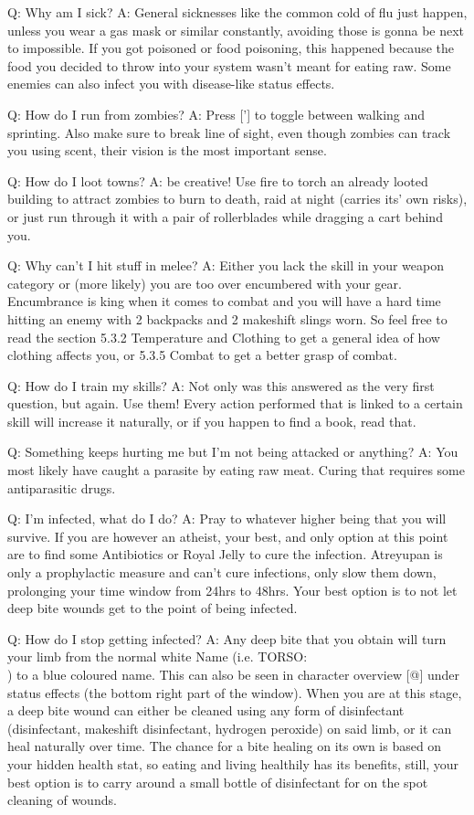 \documentclass[11pt]{report}
\begin{document}
Q: Why am I sick?
A: General sicknesses like the common cold of flu just happen, unless you wear a gas mask or similar constantly, avoiding those is gonna be next to impossible. If you got poisoned or food poisoning, this happened because the food you decided to throw into your system wasn't meant for eating raw. Some enemies can also infect you with disease-like status effects.

Q: How do I run from zombies?
A: Press ['] to toggle between walking and sprinting. Also make sure to break line of sight, even though zombies can track you using scent, their vision is the most important sense.

Q: How do I loot towns?
A: be creative! Use fire to torch an already looted building to attract zombies to burn to death, raid at night (carries its' own risks), or just run through it with a pair of rollerblades while dragging a cart behind you.

Q: Why can't I hit stuff in melee?
A: Either you lack the skill in your weapon category or (more likely) you are too over encumbered with your gear. Encumbrance is king when it comes to combat and you will have a hard time hitting an enemy with 2 backpacks and 2 makeshift slings worn. So feel free to read the section 5.3.2 Temperature and Clothing to get a general idea of how clothing affects you, or 5.3.5 Combat to get a better grasp of combat.

Q: How do I train my skills?
A: Not only was this answered as the very first question, but again. Use them! Every action performed that is linked to a certain skill will increase it naturally, or if you happen to find a book, read that.

Q: Something keeps hurting me but I'm not being attacked or anything?
A: You most likely have caught a parasite by eating raw meat. Curing that requires some antiparasitic drugs.

Q: I'm infected, what do I do?
A: Pray to whatever higher being that you will survive. If you are however an atheist, your best, and only option at this point are to find some Antibiotics or Royal Jelly to cure the infection. Atreyupan is only a prophylactic measure and can't cure infections, only slow them down, prolonging your time window from 24hrs to 48hrs. Your best option is to not let deep bite wounds get to the point of being infected.

Q: How do I stop getting infected?
A: Any deep bite that you obtain will turn your limb from the normal white Name (i.e. TORSO: \textbar\textbar\textbar\textbar\\) to a blue coloured name. This can also be seen in character overview [@] under status effects (the bottom right part of the window). When you are at this stage, a deep bite wound can either be cleaned using any form of disinfectant (disinfectant, makeshift disinfectant, hydrogen peroxide) on said limb, or it can heal naturally over time. The chance for a bite healing on its own is based on your hidden health stat, so eating and living healthily has its benefits, still, your best option is to carry around a small bottle of disinfectant for on the spot cleaning of wounds.
\end{document}
